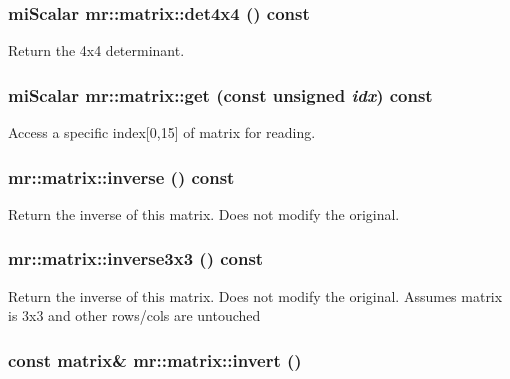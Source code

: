 \subsubsection{\setlength{\rightskip}{0pt plus 5cm}mi\-Scalar mr::matrix::det4x4 () const\hspace{0.3cm}{\tt  [inline]}}\label{classmr_1_1matrix_z23_5}


Return the 4x4 determinant. 

\subsubsection{\setlength{\rightskip}{0pt plus 5cm}mi\-Scalar mr::matrix::get (const unsigned {\em idx}) const\hspace{0.3cm}{\tt  [inline]}}\label{classmr_1_1matrix_z22_3}


Access a specific index[0,15] of matrix for reading. 

\subsubsection{ mr::matrix::inverse () const\hspace{0.3cm}{\tt  [inline]}}\label{classmr_1_1matrix_z23_2}


Return the inverse of this matrix. Does not modify the original. 
\subsubsection{ mr::matrix::inverse3x3 () const\hspace{0.3cm}{\tt  [inline]}}\label{classmr_1_1matrix_z23_8}


Return the inverse of this matrix. Does not modify the original. Assumes matrix is 3x3 and other rows/cols are untouched 
\subsubsection{\setlength{\rightskip}{0pt plus 5cm}const {\bf matrix}\& mr::matrix::invert ()\hspace{0.3cm}{\tt  [inline]}}\label{classmr_1_1matrix_z23_3}


